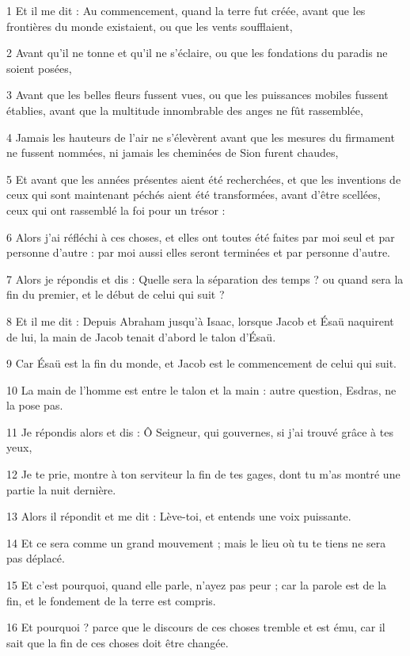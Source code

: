 \par 1 Et il me dit : Au commencement, quand la terre fut créée, avant que les frontières du monde existaient, ou que les vents soufflaient,
\par 2 Avant qu'il ne tonne et qu'il ne s'éclaire, ou que les fondations du paradis ne soient posées,
\par 3 Avant que les belles fleurs fussent vues, ou que les puissances mobiles fussent établies, avant que la multitude innombrable des anges ne fût rassemblée,
\par 4 Jamais les hauteurs de l'air ne s'élevèrent avant que les mesures du firmament ne fussent nommées, ni jamais les cheminées de Sion furent chaudes,
\par 5 Et avant que les années présentes aient été recherchées, et que les inventions de ceux qui sont maintenant péchés aient été transformées, avant d'être scellées, ceux qui ont rassemblé la foi pour un trésor :
\par 6 Alors j'ai réfléchi à ces choses, et elles ont toutes été faites par moi seul et par personne d'autre : par moi aussi elles seront terminées et par personne d'autre.
\par 7 Alors je répondis et dis : Quelle sera la séparation des temps ? ou quand sera la fin du premier, et le début de celui qui suit ?
\par 8 Et il me dit : Depuis Abraham jusqu'à Isaac, lorsque Jacob et Ésaü naquirent de lui, la main de Jacob tenait d'abord le talon d'Ésaü.
\par 9 Car Ésaü est la fin du monde, et Jacob est le commencement de celui qui suit.
\par 10 La main de l'homme est entre le talon et la main : autre question, Esdras, ne la pose pas.
\par 11 Je répondis alors et dis : Ô Seigneur, qui gouvernes, si j'ai trouvé grâce à tes yeux,
\par 12 Je te prie, montre à ton serviteur la fin de tes gages, dont tu m'as montré une partie la nuit dernière.
\par 13 Alors il répondit et me dit : Lève-toi, et entends une voix puissante.
\par 14 Et ce sera comme un grand mouvement ; mais le lieu où tu te tiens ne sera pas déplacé.
\par 15 Et c'est pourquoi, quand elle parle, n'ayez pas peur ; car la parole est de la fin, et le fondement de la terre est compris.
\par 16 Et pourquoi ? parce que le discours de ces choses tremble et est ému, car il sait que la fin de ces choses doit être changée.
